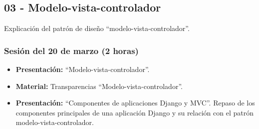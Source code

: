 \documentclass[a4paper,12pt]{article}
\begin{document}



\subsection{03 - Modelo-vista-controlador}

Explicación del patrón de diseño ``modelo-vista-controlador''.

\subsubsection{Sesión del 20 de marzo (2 horas)}

\begin{itemize}
\item \textbf{Presentación:} ``Modelo-vista-controlador''.
\item \textbf{Material:} Transparencias ``Modelo-vista-controlador''.
\item \textbf{Presentación:} ``Componentes de aplicaciones Django y MVC''.
 Repaso de los componentes principales de una aplicación Django y su relación con el patrón modelo-vista-controlador.
\end{itemize}
\end{document}
